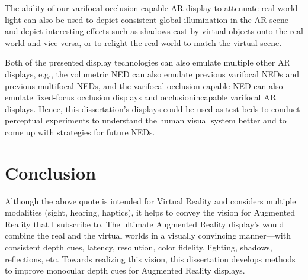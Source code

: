 The ability of our varifocal occlusion-capable AR display to attenuate real-world light can also be used to depict consistent global-illumination in the AR scene and depict interesting effects such as shadows cast by virtual objects onto the real world and vice-versa, or to relight the real-world to match the virtual scene. 

Both of the presented display technologies can also emulate multiple other AR displays, e.g., the volumetric NED can also emulate previous varifocal NEDs and previous multifocal NEDs, and the varifocal occlusion-capable NED can also emulate fixed-focus occlusion displays and occlusionincapable varifocal AR displays. 
Hence, this dissertation’s displays could be used as test-beds to conduct perceptual experiments to understand the human visual system better and to come up with strategies for future NEDs.

\section{Conclusion}


Although the above quote is intended for Virtual Reality and considers multiple modalities (sight, hearing, haptics), it helps to convey the vision for Augmented Reality that I subscribe to. 
The ultimate Augmented Reality display’s would combine the real and the virtual worlds in a visually convincing manner—with consistent depth cues, latency, resolution, color fidelity, lighting, shadows, reflections, etc. 
Towards realizing this vision, this dissertation develops methods to improve monocular depth cues for Augmented Reality displays. 


